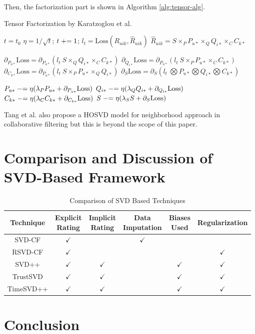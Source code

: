 \documentclass[letter paper, 11pt]{article}
\begin{document}
	Then, the factorization part is shown in Algorithm \ref{alg:tensor-alg}.
	
	\begin{algorithm}[h]
		\caption{Tensor Factorization by Karatzoglou et al.\cite{tensor}}
		\label{alg:tensor-alg}
		\begin{algorithmic}
			\STATE $t = t_0$
				\STATE $\eta = 1/\sqrt{t}$; $t \mathrel{+}= 1$; $l_t = \text{Loss}(R_{uik}, \hat{R}_{uik})$
				\STATE $\hat{R}_{uik} = S \times_P P_{u*} \times_Q Q_{i*} \times_C C_{k*}$
				
				\STATE $\partial_{P_{u*}} \text{Loss} = \partial_{P_{u*}} (l_t\ S \times_Q Q_{i*} \times_C C_{k*})$
				\STATE $\partial_{Q_{i*}} \text{Loss} = \partial_{P_{u*}} (l_t\ S \times_P P_{u*} \times_C C_{k*})$
				\STATE $\partial_{C_{k*}} \text{Loss} = \partial_{P_{u*}} (l_t\ S \times_P P_{u*} \times_Q Q_{i*})$
				\STATE $\partial_{S} \text{Loss} = \partial_{S} (l_t\ \bigotimes P_{u*} \bigotimes Q_{i*} \bigotimes C_{k*})$
												
				\STATE $P_{u*} \mathrel{-}= \eta(\lambda_P P_{u*} + \partial_{P_{u*}} \text{Loss})$
				\STATE $Q_{i*} \mathrel{-}= \eta(\lambda_Q Q_{i*} + \partial_{Q_{i*}} \text{Loss})$
				\STATE $C_{k*} \mathrel{-}= \eta(\lambda_C C_{k*} + \partial_{C_{k*}} \text{Loss})$
				\STATE $S \mathrel{-}= \eta(\lambda_S S + \partial_{S} \text{Loss})$
			\ENDWHILE
		\end{algorithmic}
	\end{algorithm}

	Tang et al. also propose a HOSVD model for neighborhood approach in collaborative filtering \cite{tensor-neighbor} but this is beyond the scope of this paper.
	
	
	\section{Comparison and Discussion of SVD-Based Framework}



	\begin{table}[h]
		\centering
		\begin{tabular}{|c|c|c|c|c|c|}
			\hline
			Technique & Explicit Rating & Implicit Rating & Data Imputation & Biases Used & Regularization \\ \hline
			SVD-CF & $\checkmark$ &  & $\checkmark$ &  &  \\ \hline
			RSVD-CF & $\checkmark$ &  & &  & $\checkmark$ \\ \hline
			SVD++ & $\checkmark$ & $\checkmark$ & & $\checkmark$ & $\checkmark$ \\ \hline
			TrustSVD & $\checkmark$ & $\checkmark$ & & $\checkmark$ & $\checkmark$ \\ \hline
			TimeSVD++ & $\checkmark$ & $\checkmark$ & & $\checkmark$ & $\checkmark$ \\ \hline
		\end{tabular}
		\caption{Comparison of SVD Based Techniques\cite{review}}
		\label{comparison}
	\end{table}
	
	
	\section{Conclusion}

	
	
\end{document}
